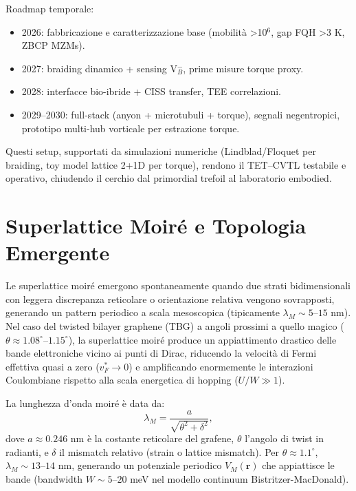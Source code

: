 \documentclass[11pt,a4paper]{article}
\theoremstyle{plain}
\theoremstyle{definition}
\begin{document}
Roadmap temporale:
\begin{itemize}
    \item 2026: fabbricazione e caratterizzazione base (mobilità >10$^6$, gap FQH >3 K, ZBCP MZMs).
    \item 2027: braiding dinamico + sensing V$_B^-$, prime misure torque proxy.
    \item 2028: interfacce bio-ibride + CISS transfer, TEE correlazioni.
    \item 2029–2030: full-stack (anyon + microtubuli + torque), segnali negentropici, prototipo multi-hub vorticale per estrazione torque.
\end{itemize}

Questi setup, supportati da simulazioni numeriche (Lindblad/Floquet per braiding, toy model lattice 2+1D per torque), rendono il TET–CVTL testabile e operativo, chiudendo il cerchio dal primordial trefoil al laboratorio embodied.















\section{Superlattice Moiré e Topologia Emergente}

Le superlattice moiré emergono spontaneamente quando due strati bidimensionali con leggera discrepanza reticolare o orientazione relativa vengono sovrapposti, generando un pattern periodico a scala mesoscopica (tipicamente $\lambda_M \sim 5$--$15$ nm). Nel caso del twisted bilayer graphene (TBG) a angoli prossimi a quello magico ($\theta \approx 1.08^\circ$--$1.15^\circ$), la superlattice moiré produce un appiattimento drastico delle bande elettroniche vicino ai punti di Dirac, riducendo la velocità di Fermi effettiva quasi a zero ($v_F^* \to 0$) e amplificando enormemente le interazioni Coulombiane rispetto alla scala energetica di hopping ($U/W \gg 1$).

La lunghezza d'onda moiré è data da:
\begin{equation}
\lambda_M = \frac{a}{\sqrt{\theta^2 + \delta^2}},
\end{equation}
dove $a \approx 0.246$ nm è la costante reticolare del grafene, $\theta$ l'angolo di twist in radianti, e $\delta$ il mismatch relativo (strain o lattice mismatch). Per $\theta \approx 1.1^\circ$, $\lambda_M \sim 13$--$14$ nm, generando un potenziale periodico $V_M(\mathbf{r})$ che appiattisce le bande (bandwidth $W \sim 5$--$20$ meV nel modello continuum Bistritzer-MacDonald).
\end{document}
